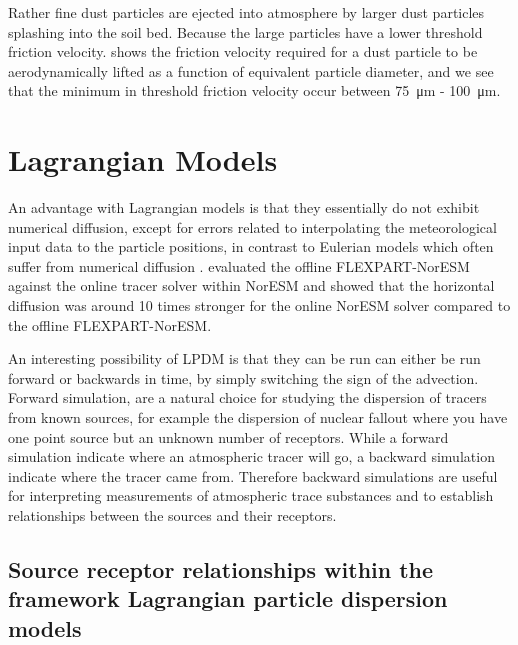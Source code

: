 Rather fine dust particles are ejected into atmosphere by larger dust particles splashing into the soil bed. Because the large particles have a  lower threshold friction velocity.  shows the friction velocity required for a dust particle to be aerodynamically lifted as a function of equivalent particle diameter, and we see that the minimum in threshold friction velocity occur between \SI{75}{\micro\metre} - \SI{100}{\micro\metre}.


\section{Lagrangian Models}
An advantage with Lagrangian models is that they essentially do not exhibit numerical diffusion, except for errors related to interpolating the meteorological input data to the particle positions, in contrast to Eulerian models which often suffer from numerical diffusion \parencite{cassiani_offline_2016}. \textcite{cassiani_offline_2016} evaluated the offline FLEXPART-NorESM against the online tracer solver within NorESM and showed that the horizontal diffusion was around 10 times stronger for the online NorESM solver compared to the offline FLEXPART-NorESM. 

An interesting possibility of LPDM is that they can be run can either be run forward or backwards in time, by simply switching the sign of the advection. Forward simulation, are a natural choice for studying the dispersion of tracers from known sources, for example the dispersion of nuclear fallout where you have one point source but an unknown number of receptors. While a forward simulation indicate where an atmospheric tracer will go, a backward simulation indicate where the tracer came from. Therefore backward simulations are useful for interpreting measurements of atmospheric trace substances and to establish relationships between the sources and their receptors.  

\subsection{Source receptor relationships within the framework Lagrangian particle dispersion models}

